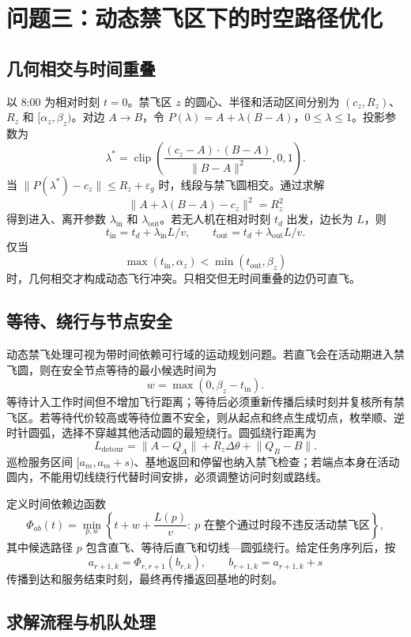 \section{问题三：动态禁飞区下的时空路径优化}

\subsection{几何相交与时间重叠}

以 8:00 为相对时刻 $t=0$。禁飞区 $z$ 的圆心、半径和活动区间分别为 $(c_z,R_z)$、$R_z$ 和 $[\alpha_z,\beta_z)$。对边 $A\to B$，令 $P(\lambda)=A+\lambda(B-A)$，$0\leq\lambda\leq1$。投影参数为
\[
\lambda^*=\operatorname{clip}\left(\frac{(c_z-A)\cdot(B-A)}{\lVert B-A\rVert^2},0,1\right).
\]
当 $\lVert P(\lambda^*)-c_z\rVert\leq R_z+\varepsilon_g$ 时，线段与禁飞圆相交。通过求解
\[
\lVert A+\lambda(B-A)-c_z\rVert^2=R_z^2
\]
得到进入、离开参数 $\lambda_{\mathrm{in}}$ 和 $\lambda_{\mathrm{out}}$。若无人机在相对时刻 $t_d$ 出发，边长为 $L$，则
\[
t_{\mathrm{in}}=t_d+\lambda_{\mathrm{in}}L/v,\qquad
t_{\mathrm{out}}=t_d+\lambda_{\mathrm{out}}L/v.
\]
仅当
\[
\max(t_{\mathrm{in}},\alpha_z)<\min(t_{\mathrm{out}},\beta_z)
\]
时，几何相交才构成动态飞行冲突。只相交但无时间重叠的边仍可直飞。

\subsection{等待、绕行与节点安全}

动态禁飞处理可视为带时间依赖可行域的运动规划问题\cite{lavalle2006}。若直飞会在活动期进入禁飞圆，则在安全节点等待的最小候选时间为
\[
w=\max(0,\beta_z-t_{\mathrm{in}}).
\]
等待计入工作时间但不增加飞行距离；等待后必须重新传播后续时刻并复核所有禁飞区。若等待代价较高或等待位置不安全，则从起点和终点生成切点，枚举顺、逆时针圆弧，选择不穿越其他活动圆的最短绕行。圆弧绕行距离为
\[
L_{\mathrm{detour}}=\lVert A-Q_A\rVert+R_z\Delta\theta+\lVert Q_B-B\rVert.
\]
巡检服务区间 $[a_m,a_m+s)$、基地返回和停留也纳入禁飞检查；若端点本身在活动圆内，不能用切线绕行代替时间安排，必须调整访问时刻或路线。

定义时间依赖边函数
\[
\Phi_{ab}(t)=\min_{p,w}\left\{t+w+\frac{L(p)}v:\ p\text{ 在整个通过时段不违反活动禁飞区}\right\},
\]
其中候选路径 $p$ 包含直飞、等待后直飞和切线—圆弧绕行。给定任务序列后，按
\[
a_{r+1,k}=\Phi_{r,r+1}(b_{r,k}),\qquad b_{r+1,k}=a_{r+1,k}+s
\]
传播到达和服务结束时刻，最终再传播返回基地的时刻。

\subsection{求解流程与机队处理}

